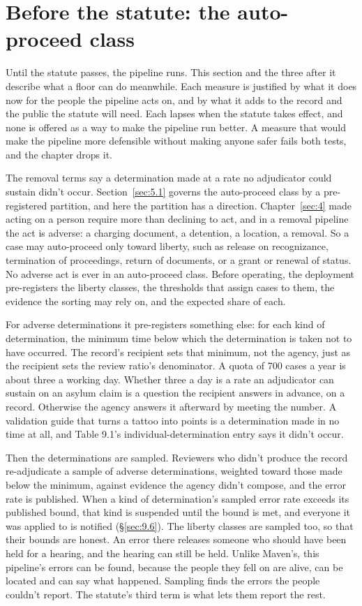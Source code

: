 \section{Before the statute: the auto-proceed class}
\label{sec:9.5}
Until the statute passes, the pipeline runs. This section and the three after it describe what a floor can do meanwhile. Each measure is justified by what it does now for the people the pipeline acts on, and by what it adds to the record and the public the statute will need. Each lapses when the statute takes effect, and none is offered as a way to make the pipeline run better. A measure that would make the pipeline more defensible without making anyone safer fails both tests, and the chapter drops it.

The removal terms say a determination made at a rate no adjudicator could sustain didn't occur. Section~\ref{sec:5.1} governs the auto-proceed class by a pre-registered partition, and here the partition has a direction. Chapter~\ref{sec:4} made acting on a person require more than declining to act, and in a removal pipeline the act is adverse: a charging document, a detention, a location, a removal. So a case may auto-proceed only toward liberty, such as release on recognizance, termination of proceedings, return of documents, or a grant or renewal of status. No adverse act is ever in an auto-proceed class. Before operating, the deployment pre-registers the liberty classes, the thresholds that assign cases to them, the evidence the sorting may rely on, and the expected share of each.

For adverse determinations it pre-registers something else: for each kind of determination, the minimum time below which the determination is taken not to have occurred. The record's recipient sets that minimum, not the agency, just as the recipient sets the review ratio's denominator. A quota of 700 cases a year is about three a working day. Whether three a day is a rate an adjudicator can sustain on an asylum claim is a question the recipient answers in advance, on a record. Otherwise the agency answers it afterward by meeting the number. A validation guide that turns a tattoo into points is a determination made in no time at all, and Table 9.1's individual-determination entry says it didn't occur.

Then the determinations are sampled. Reviewers who didn't produce the record re-adjudicate a sample of adverse determinations, weighted toward those made below the minimum, against evidence the agency didn't compose, and the error rate is published. When a kind of determination's sampled error rate exceeds its published bound, that kind is suspended until the bound is met, and everyone it was applied to is notified (\S\ref{sec:9.6}). The liberty classes are sampled too, so that their bounds are honest. An error there releases someone who should have been held for a hearing, and the hearing can still be held. Unlike Maven's, this pipeline's errors can be found, because the people they fell on are alive, can be located and can say what happened. Sampling finds the errors the people couldn't report. The statute's third term is what lets them report the rest.
